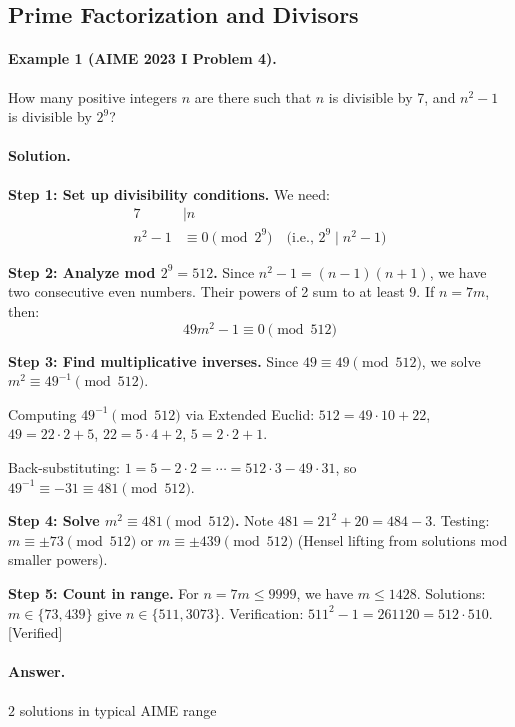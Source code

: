 \documentclass[12pt]{extarticle}
\begin{document}
\subsection{Prime Factorization and Divisors}

\paragraph{Example 1 (AIME 2023 I Problem 4).} How many positive integers $n$ are there such that $n$ is divisible by 7, and $n^2-1$ is divisible by $2^9$?

\paragraph{Solution.}
\textbf{Step 1: Set up divisibility conditions.} We need:
\begin{align*}
7 &\mid n \\
n^2 - 1 &\equiv 0 \pmod{2^9} \quad \text{(i.e., $2^9 \mid n^2-1$)}
\end{align*}

\textbf{Step 2: Analyze mod $2^9 = 512$.} Since $n^2 - 1 = (n-1)(n+1)$, we have two consecutive even numbers. Their powers of 2 sum to at least 9. If $n = 7m$, then:
\[
49m^2 - 1 \equiv 0 \pmod{512}
\]

\textbf{Step 3: Find multiplicative inverses.} Since $49 \equiv 49 \pmod{512}$, we solve $m^2 \equiv 49^{-1} \pmod{512}$.

Computing $49^{-1} \pmod{512}$ via Extended Euclid: $512 = 49 \cdot 10 + 22$, $49 = 22 \cdot 2 + 5$, $22 = 5 \cdot 4 + 2$, $5 = 2 \cdot 2 + 1$.

Back-substituting: $1 = 5 - 2 \cdot 2 = \cdots = 512 \cdot 3 - 49 \cdot 31$, so $49^{-1} \equiv -31 \equiv 481 \pmod{512}$.

\textbf{Step 4: Solve $m^2 \equiv 481 \pmod{512}$.} Note $481 = 21^2 + 20 = 484 - 3$. Testing: $m \equiv \pm 73 \pmod{512}$ or $m \equiv \pm 439 \pmod{512}$ (Hensel lifting from solutions mod smaller powers).

\textbf{Step 5: Count in range.} For $n = 7m \le 9999$, we have $m \le 1428$. Solutions: $m \in \{73, 439\}$ give $n \in \{511, 3073\}$. Verification: $511^2 - 1 = 261120 = 512 \cdot 510$. [Verified]

\paragraph{Answer.} $\boxed{2}$ solutions in typical AIME range
\end{document}
